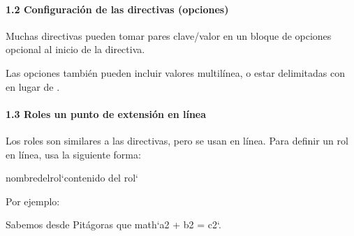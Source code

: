 \documentclass[a4paper,10pt,oneside,spanish,openany]{sphinxmanual}
\begin{document}
\paragraph{1.2 Configuración de las directivas (opciones)}
\label{\detokenize{configuracion_inicial/013.guia_de_myst_parser:configuracion-de-las-directivas-opciones}}
\sphinxAtStartPar
Muchas directivas pueden tomar pares clave/valor en un bloque de opciones opcional al inicio de la directiva.

%
\begin{sphinxVerbatim}[commandchars=\\\{\},numbers=left,firstnumber=10,stepnumber=1]
  
\end{sphinxVerbatim}
\sphinxresetverbatimhllines

\sphinxAtStartPar
Las opciones también pueden incluir valores multilínea, o estar delimitadas con \sphinxcode{\sphinxupquote{\sphinxhyphen{}\sphinxhyphen{}\sphinxhyphen{}}} en lugar de \sphinxcode{\sphinxupquote{:}}.


\paragraph{1.3 Roles \sphinxhyphen{} un punto de extensión en línea}
\label{\detokenize{configuracion_inicial/013.guia_de_myst_parser:roles-un-punto-de-extension-en-linea}}
\sphinxAtStartPar
Los roles son similares a las directivas, pero se usan en línea.
Para definir un rol en línea, usa la siguiente forma:

\begin{sphinxVerbatim}[commandchars=\\\{\}]
\PYGZob{}nombre\PYGZhy{}del\PYGZhy{}rol\PYGZcb{}`contenido del rol`
\end{sphinxVerbatim}

\sphinxAtStartPar
Por ejemplo:

\begin{sphinxVerbatim}[commandchars=\\\{\}]
Sabemos desde Pitágoras que \PYGZob{}math\PYGZcb{}`a\PYGZca{}2 + b\PYGZca{}2 = c\PYGZca{}2`.
\end{sphinxVerbatim}
\end{document}
